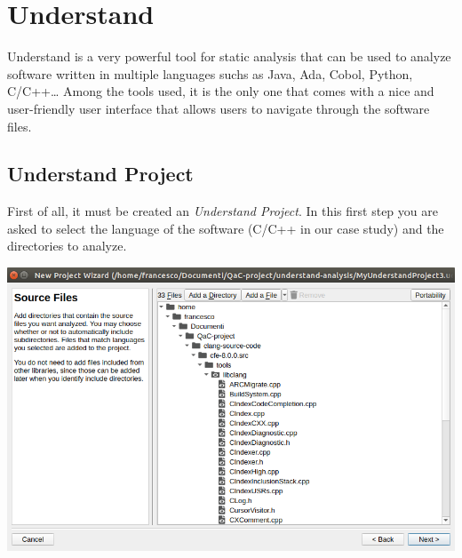 \section{Understand}

Understand is a very powerful tool for static analysis that can be used to analyze software written in multiple languages suchs as Java, Ada, Cobol, Python, C/C++\dots
Among the tools used, it is the only one that comes with a nice and user-friendly user interface that allows users to navigate through the software files.

\subsection{Understand Project}

First of all, it must be created an \textsl{Understand Project}. In this first step you are asked to select the language of the software (C/C++ in our case study) and the directories to analyze.\newline\newline
\vspace{1cm}
\begin{minipage}{\linewidth}
	\includegraphics[width=\textwidth]{img/libclangDirectory.png}
\end{minipage}

